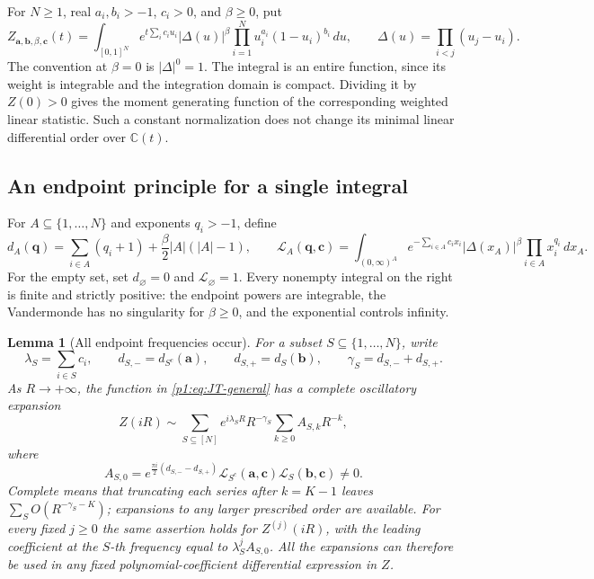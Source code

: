 \documentclass[11pt,a4paper]{article}
\newtheorem{lemma}[theorem]{Lemma}
\theoremstyle{definition}
\theoremstyle{remark}
\numberwithin{equation}{section}
\begin{document}
For $N\ge1$, real $a_i,b_i>-1$, $c_i>0$, and $\beta\ge0$, put
\begin{equation}\label{p1:eq:JT-general}
 Z_{\mathbf a,\mathbf b,\beta,\mathbf c}(t)
 =\int_{[0,1]^N}e^{t\sum_i c_i u_i}
   |\Delta(u)|^\beta\prod_{i=1}^N u_i^{a_i}(1-u_i)^{b_i}\,du,
 \qquad \Delta(u)=\prod_{i<j}(u_j-u_i).
\end{equation}
The convention at $\beta=0$ is $|\Delta|^0=1$.
The integral is an entire function, since its weight is integrable and
the integration domain is compact.  Dividing it by $Z(0)>0$ gives the
moment generating function of the corresponding weighted linear
statistic.  Such a constant normalization does not change its minimal
linear differential order over $\mathbb C(t)$.

\subsection{An endpoint principle for a single integral}

For $A\subseteq\{1,\ldots,N\}$ and exponents $q_i>-1$, define
\[
 d_A(\mathbf q)=\sum_{i\in A}(q_i+1)
                  +\frac\beta2|A|(|A|-1),\qquad
 \mathcal L_A(\mathbf q,\mathbf c)
 =\int_{(0,\infty)^A}e^{-\sum_{i\in A}c_i x_i}
   |\Delta(x_A)|^\beta\prod_{i\in A}x_i^{q_i}\,dx_A.
\]
For the empty set, set $d_\varnothing=0$ and
$\mathcal L_\varnothing=1$.  Every nonempty integral on the right is
finite and strictly positive: the endpoint powers are integrable, the
Vandermonde has no singularity for $\beta\ge0$, and the exponential
controls infinity.

\begin{lemma}[All endpoint frequencies occur]\label{p1:lem:JT-endpoints}
For a subset $S\subseteq\{1,\ldots,N\}$, write
\[
 \lambda_S=\sum_{i\in S}c_i,\qquad
 d_{S,-}=d_{S^c}(\mathbf a),\qquad d_{S,+}=d_S(\mathbf b),\qquad
 \gamma_S=d_{S,-}+d_{S,+}.
\]
As $R\to+\infty$, the function in \eqref{p1:eq:JT-general} has a complete
oscillatory expansion
\begin{equation}\label{p1:eq:JT-asymptotic}
 Z(iR)\sim\sum_{S\subseteq[N]}e^{i\lambda_SR}
       R^{-\gamma_S}\sum_{k\ge0}A_{S,k}R^{-k},
\end{equation}
where
\begin{equation}\label{p1:eq:JT-amplitudes}
 A_{S,0}=e^{\frac{\pi i}{2}(d_{S,-}-d_{S,+})}
    \mathcal L_{S^c}(\mathbf a,\mathbf c)
    \mathcal L_S(\mathbf b,\mathbf c)\ne0.
\end{equation}
Complete means that truncating each series after $k=K-1$ leaves
$\sum_S O(R^{-\gamma_S-K})$; expansions to any larger prescribed
order are available.  For every fixed $j\ge0$ the same assertion holds
for $Z^{(j)}(iR)$, with the leading coefficient at the $S$-th frequency
equal to $\lambda_S^jA_{S,0}$.  All the expansions can therefore be
used in any fixed polynomial-coefficient differential expression in $Z$.
\end{lemma}
\end{document}
